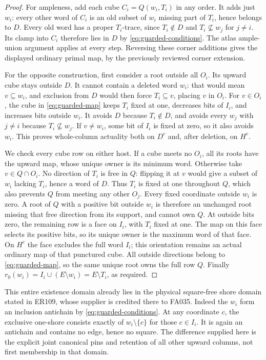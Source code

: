 \documentclass[11pt]{article}
\theoremstyle{definition}
\begin{document}
\begin{proof}
For ampleness, add each cube $C_i=Q(w_i,T_i)$ in any order.
It adds just $w_i$: every other word of $C_i$ is an old subset of
$w_i$ missing part of $T_i$, hence belongs to $D$.
Every old word has a proper $T_i$-trace, since $T_i\notin D$ and
$T_i\nsubseteq w_j$ for $j\ne i$. Its clamp into $C_i$ therefore lies
in $D$ by \eqref{eq:guarded-conditions}. The atlas ample-union argument
applies at every step. Reversing these corner additions gives the
displayed ordinary primal map, by the previously reviewed corner extension.

For the opposite construction, first consider a root outside all $O_i$.
Its upward cube stays outside $D$. It cannot contain a deleted word $w_i$:
that would mean $v\subseteq w_i$, and exclusion from $D$ would then
force $T_i\subseteq v$, placing $v$ in $O_i$.
For $v\in O_i$, the cube in \eqref{eq:guarded-map} keeps $T_i$ fixed
at one, decreases bits of $I_i$, and increases bits outside $w_i$.
It avoids $D$ because $T_i\notin D$, and avoids every $w_j$ with
$j\ne i$ because $T_i\nsubseteq w_j$. If $v\ne w_i$, some bit of
$I_i$ is fixed at zero, so it also avoids $w_i$. This proves whole-column
actuality both on $D^c$ and, after deletion, on $H^c$.

We check every cube row on either host. If a cube meets no $O_i$,
all its roots have the upward map, whose unique owner is its minimum word.
Otherwise take $v\in Q\cap O_i$. No direction of $T_i$ is free in $Q$:
flipping it at $v$ would give a subset of $w_i$ lacking $T_i$, hence a
word of $D$. Thus $T_i$ is fixed at one throughout $Q$, which also
prevents $Q$ from meeting any other $O_j$. Every fixed coordinate outside
$w_i$ is zero. A root of $Q$ with a positive bit outside $w_i$ is therefore
an unchanged root missing that free direction from its support, and cannot
own $Q$. At outside bits zero, the remaining row is a face on $I_i$,
with $T_i$ fixed at one. The map on this face selects its positive bits,
so its unique owner is the maximum word of that face. On $H^c$ the face
excludes the full word $I_i$; this orientation remains an actual ordinary
map of that punctured cube. All outside directions belong to
\eqref{eq:guarded-map}, so the same unique root owns the full row $Q$.
Finally $r_0(w_i)=I_i\cup(E\setminus w_i)=E\setminus T_i$, as required.
\end{proof}

This entire existence domain already lies in the physical square-free
shore domain stated in ER109, whose supplier is credited there to FA035.
Indeed the $w_i$ form an inclusion antichain by
\eqref{eq:guarded-conditions}. At any coordinate $c$, the exclusive
one-shore consists exactly of $w_i\setminus\{c\}$ for those $c\in I_i$.
It is again an antichain and contains no edge, hence no square.
The difference supplied here is the explicit joint canonical pins and
retention of all other upward columns, not first membership in that domain.
\end{document}
